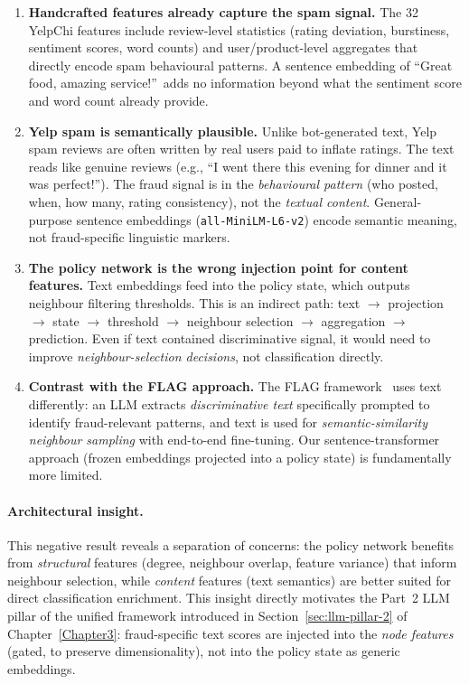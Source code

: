 \begin{enumerate}
    \item \textbf{Handcrafted features already capture the spam signal.} The 32 YelpChi features include review-level statistics (rating deviation, burstiness, sentiment scores, word counts) and user/product-level aggregates that directly encode spam behavioural patterns. A sentence embedding of ``Great food, amazing service!''\ adds no information beyond what the sentiment score and word count already provide.
    \item \textbf{Yelp spam is semantically plausible.} Unlike bot-generated text, Yelp spam reviews are often written by real users paid to inflate ratings. The text reads like genuine reviews (e.g., ``I went there this evening for dinner and it was perfect!''). The fraud signal is in the \emph{behavioural pattern} (who posted, when, how many, rating consistency), not the \emph{textual content}. General-purpose sentence embeddings (\texttt{all-MiniLM-L6-v2}) encode semantic meaning, not fraud-specific linguistic markers.
    \item \textbf{The policy network is the wrong injection point for content features.} Text embeddings feed into the policy state, which outputs neighbour filtering thresholds. This is an indirect path: text $\to$ projection $\to$ state $\to$ threshold $\to$ neighbour selection $\to$ aggregation $\to$ prediction. Even if text contained discriminative signal, it would need to improve \emph{neighbour-selection decisions}, not classification directly.
    \item \textbf{Contrast with the FLAG approach.} The FLAG framework~\cite{yang2025flag} uses text differently: an LLM extracts \emph{discriminative text} specifically prompted to identify fraud-relevant patterns, and text is used for \emph{semantic-similarity neighbour sampling} with end-to-end fine-tuning. Our sentence-transformer approach (frozen embeddings projected into a policy state) is fundamentally more limited.
\end{enumerate}

\paragraph{Architectural insight.} This negative result reveals a separation of concerns: the policy network benefits from \emph{structural} features (degree, neighbour overlap, feature variance) that inform neighbour selection, while \emph{content} features (text semantics) are better suited for direct classification enrichment. This insight directly motivates the Part~2 LLM pillar of the unified framework introduced in Section~\ref{sec:llm-pillar-2} of Chapter~\ref{Chapter3}: fraud-specific text scores are injected into the \emph{node features} (gated, to preserve dimensionality), not into the policy state as generic embeddings.


